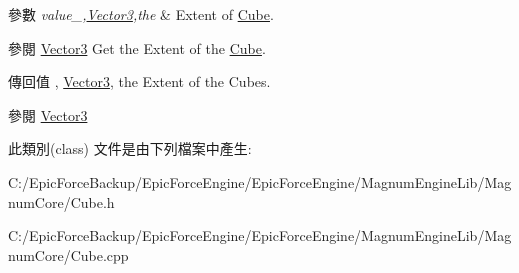 \begin{DoxyParams}{參數}
{\em value\+\_\+,\hyperlink{class_magnum_1_1_vector3}{Vector3},the} & Extent of \hyperlink{class_magnum_1_1_cube}{Cube}. \\
\hline
\end{DoxyParams}
\begin{DoxySeeAlso}{參閱}
\hyperlink{class_magnum_1_1_vector3}{Vector3} Get the Extent of the \hyperlink{class_magnum_1_1_cube}{Cube}. 
\end{DoxySeeAlso}
\begin{DoxyReturn}{傳回值}
, \hyperlink{class_magnum_1_1_vector3}{Vector3}, the Extent of the Cubes. 
\end{DoxyReturn}
\begin{DoxySeeAlso}{參閱}
\hyperlink{class_magnum_1_1_vector3}{Vector3} 
\end{DoxySeeAlso}


此類別(class) 文件是由下列檔案中產生\+:\begin{DoxyCompactItemize}
\item 
C\+:/\+Epic\+Force\+Backup/\+Epic\+Force\+Engine/\+Epic\+Force\+Engine/\+Magnum\+Engine\+Lib/\+Magnum\+Core/Cube.\+h\item 
C\+:/\+Epic\+Force\+Backup/\+Epic\+Force\+Engine/\+Epic\+Force\+Engine/\+Magnum\+Engine\+Lib/\+Magnum\+Core/Cube.\+cpp\end{DoxyCompactItemize}
